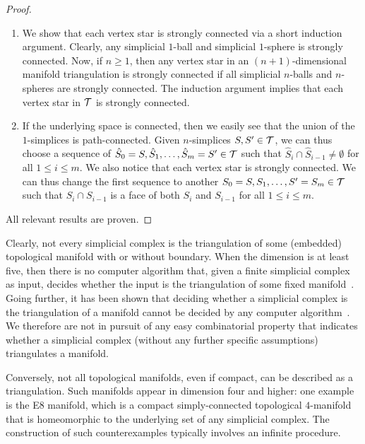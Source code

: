 \documentclass[12pt,a4paper]{article}
\begin{document}
\begin{proof}
\begin{enumerate}
    \item 
    We show that each vertex star is strongly connected via a short induction argument.
    Clearly, any simplicial $1$-ball and simplicial $1$-sphere is strongly connected. 
    Now, if $n \geq 1$, then any vertex star in an $(n+1)$-dimensional manifold triangulation is strongly connected if all simplicial $n$-balls and $n$-spheres are strongly connected.
    The induction argument implies that each vertex star in ${\mathcal T}$ is strongly connected.

    \item 
    If the underlying space is connected, then we easily see that the union of the $1$-simplices is path-connected.
    Given $n$-simplices $S,S' \in {\mathcal T}$, 
    we can thus choose a sequence of $\hat S_0=S,\hat S_1,\dots,\hat S_m=S' \in {\mathcal T}$ such that $\hat S_{i} \cap \hat S_{i-1} \neq \emptyset$ for all $1 \leq i \leq m$.
    We also notice that each vertex star is strongly connected. 
    We can thus change the first sequence to another $S_0=S,S_1,\dots,S'=S_m \in {\mathcal T}$ 
    such that $S_{i} \cap S_{i-1}$ is a face of both $S_{i}$ and $S_{i-1}$ for all $1 \leq i \leq m$.
    \end{enumerate}
    All relevant results are proven. 
\end{proof}






\begin{remark}
    Clearly, not every simplicial complex is the triangulation of some (embedded) topological manifold with or without boundary. 
    When the dimension is at least five, then there is no computer algorithm that, given a finite simplicial complex as input, decides whether the input is the triangulation of some fixed manifold~\cite{chernavsky2006unrecognizability}.
    Going further, it has been shown that deciding whether a simplicial complex is the triangulation of a manifold cannot be decided by any computer algorithm~\cite{poonen2014undecidable}.     
    We therefore are not in pursuit of any easy combinatorial property that indicates whether a simplicial complex (without any further specific assumptions) triangulates a manifold.

    Conversely, not all topological manifolds, even if compact, can be described as a triangulation. 
    Such manifolds appear in dimension four and higher:
    one example is the E8 manifold, which is a compact simply-connected topological $4$-manifold that is homeomorphic to the underlying set of any simplicial complex. The construction of such counterexamples typically involves an infinite procedure.
\end{remark}
\end{document}
